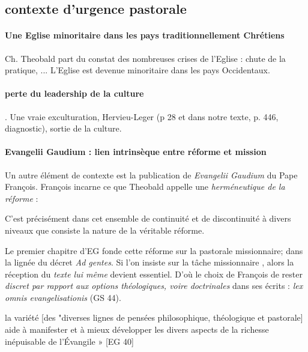  
 
 

 \subsection{contexte d'urgence pastorale}


\paragraph{Une Eglise minoritaire dans les pays traditionnellement Chrétiens} Ch. Theobald part du constat des nombreuses crises de l'Eglise : chute de la pratique, ... L'Eglise est devenue minoritaire dans les pays Occidentaux. \paragraph{perte du leadership de la culture}. Une vraie exculturation, Hervieu-Leger (p 28 et dans notre texte, p. 446, diagnostic), sortie de la culture. 
 

\paragraph{Evangelii Gaudium : lien intrinsèque entre réforme et mission} Un autre élément de contexte est la publication de \textit{Evangelii Gaudium} du Pape François. François incarne ce que Theobald \cite{theobald_pastoralite_2021} appelle une \textit{herméneutique de la réforme} : \begin{singlequote}
C’est précisément dans cet ensemble de continuité et de discontinuité à divers niveaux que
consiste la nature de la véritable réforme. \cite{benoit_xvi_discours_2005}
\end{singlequote} Le premier chapitre d'EG fonde cette réforme sur la pastorale missionnaire; dans la lignée du décret \textit{Ad gentes}. Si l'on insiste sur la tâche missionnaire \cite[p.162]{theobald_urgences_2017}, alors la réception du \textit{texte lui même} devient essentiel. D'où le choix de François de rester \textit{discret par rapport aux options théologiques, voire doctrinales} dans ses écrits : \textit{lex omnis evangelisationis } (GS 44).
\begin{singlequote}
     la variété [des "diverses lignes de pensées philosophique, théologique et pastorale] aide à manifester et à mieux développer les divers aspects de la richesse inépuisable de l'Évangile » [EG 40]
\end{singlequote}

